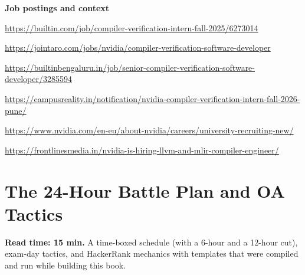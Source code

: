 \documentclass[10pt,a4paper,openany,oneside]{report}
\begin{document}
\textbf{Job postings and context}\par
\begin{description}[leftmargin=1.2cm,labelwidth=1cm,itemsep=0.5pt,topsep=1pt,font=\bfseries\footnotesize]
\item[J1] \url{https://builtin.com/job/compiler-verification-intern-fall-2025/6273014}
\item[J2] \url{https://jointaro.com/jobs/nvidia/compiler-verification-software-developer}
\item[J3] \url{https://builtinbengaluru.in/job/senior-compiler-verification-software-developer/3285594}
\item[J4] \url{https://campusreality.in/notification/nvidia-compiler-verification-intern-fall-2026-pune/}
\item[J5] \url{https://www.nvidia.com/en-eu/about-nvidia/careers/university-recruiting-new/}
\item[J6] \url{https://frontlinesmedia.in/nvidia-is-hiring-llvm-and-mlir-compiler-engineer/}
\end{description}
\normalsize


\chapter{The 24-Hour Battle Plan and OA Tactics}
\label{ch:plan}

\begin{chapbox}
\textbf{Read time: 15 min.} A time-boxed schedule (with a 6-hour and a 12-hour cut), exam-day tactics, and HackerRank mechanics with templates that
were compiled and run while building this book.
\end{chapbox}
\end{document}
